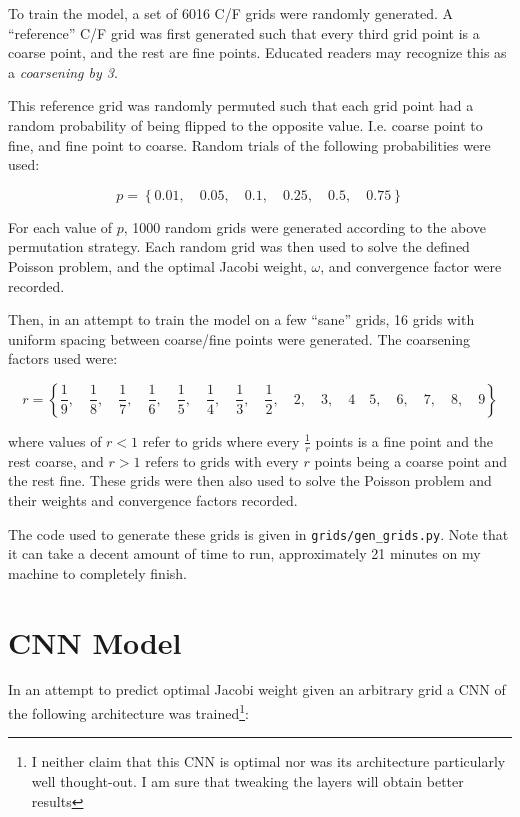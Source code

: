 To train the model, a set of 6016 C/F grids were randomly generated.  A ``reference'' C/F grid was first generated such that every third grid point is a coarse point, and the rest are fine points.  Educated readers may recognize this as a \textit{coarsening by 3}.

This reference grid was randomly permuted such that each grid point had a random probability of being flipped to the opposite value.  I.e. coarse point to fine, and fine point to coarse.  Random trials of the following probabilities were used:

$$ p = \left\{0.01, \quad 0.05, \quad 0.1, \quad 0.25, \quad 0.5, \quad 0.75\right\} $$

For each value of $p$, 1000 random grids were generated according to the above permutation strategy.  Each random grid was then used to solve the defined Poisson problem, and the optimal Jacobi weight, $\omega$, and convergence factor were recorded.

Then, in an attempt to train the model on a few ``sane'' grids, 16 grids with uniform spacing between coarse/fine points were generated.  The coarsening factors used were:

$$r = \left\{
\frac{1}{9},\quad
\frac{1}{8},\quad
\frac{1}{7},\quad
\frac{1}{6},\quad
\frac{1}{5},\quad
\frac{1}{4},\quad
\frac{1}{3},\quad
\frac{1}{2},\quad
2,\quad
3,\quad
4\quad
5,\quad
6,\quad
7,\quad
8,\quad
9
\right\}$$

where values of $r<1$ refer to grids where every $\frac{1}{r}$ points is a fine point and the rest coarse, and $r>1$ refers to grids with every $r$ points being a coarse point and the rest fine.  These grids were then also used to solve the Poisson problem and their weights and convergence factors recorded.

The code used to generate these grids is given in \texttt{grids/gen\_grids.py}.  Note that it can take a decent amount of time to run, approximately 21 minutes on my machine to completely finish.

\section{CNN Model}

In an attempt to predict optimal Jacobi weight given an arbitrary grid a CNN of the following architecture was trained\footnote{I neither claim that this CNN is optimal nor was its architecture particularly well thought-out.  I am sure that tweaking the layers will obtain better results}:

